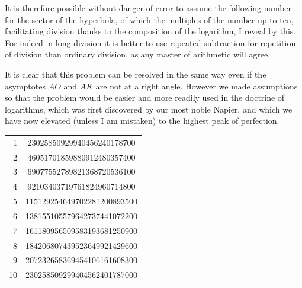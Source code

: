\documentclass[11pt,letterpaper]{book}
\begin{document}
It is therefore possible without danger of error to assume the following number
for the sector of the hyperbola, of which the multiples of the number up to ten,
facilitating division thanks to the composition of the logarithm, I reveal by
this.
For indeed in long division it is better to use repeated subtraction for
repetition of division than ordinary division, as any master of
arithmetic will agree.

It is clear that this problem can be resolved in the same way even if the
asymptotes $AO$ and $AK$ are not at a right angle. However we made assumptions
so that the problem would be easier and more readily used in the doctrine
of logarithms, which was first discovered by our most noble Napier, and which
we have now elevated (unless I am mistaken) to the highest peak of
perfection.

\begin{center}
\begin{tabular}{ r c }
1  & 23025850929940456240178700 \\
2  & 46051701859880912480357400 \\
3  & 69077552789821368720536100 \\
4  & 92103403719761824960714800 \\
5  & 115129254649702281200893500 \\
6  & 138155105579642737441072200 \\
7  & 161180956509583193681250900 \\
8  & 184206807439523649921429600 \\
9  & 207232658369454106161608300 \\
10 & 230258509299404562401787000 \\ [1.0em]
\end{tabular}
\end{center}


\end{document}
